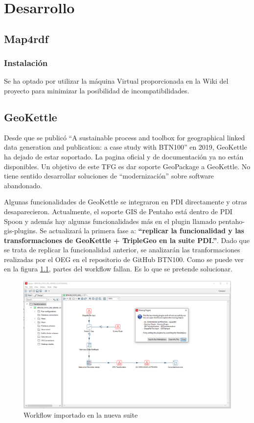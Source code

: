 \chapter{Desarrollo}

\section{Map4rdf}
\subsection{Instalación}

Se ha optado por utilizar la máquina Virtual proporcionada en la Wiki del proyecto para minimizar la posibilidad
de incompatibilidades.

\section{GeoKettle}

Desde que se publicó ``A sustainable process and toolbox for geographical linked data generation and
publication: a case study with BTN100'' en 2019, GeoKettle ha dejado de estar soportado. La pagina oficial y de
documentación ya no están disponibles.
Un objetivo de este TFG es dar soporte GeoPackage a GeoKettle. No tiene sentido desarrollar soluciones de
``modernización'' sobre software abandonado.

Algunas funcionalidades de GeoKettle se integraron en PDI directamente y otras desaparecieron. 
Actualmente, el soporte GIS de Pentaho está dentro de PDI Spoon y además hay algunas funcionalidades más en
 el plugin llamado pentaho-gis-plugins\cite{gis-plugins}. Se actualizará la primera fase a:
\textbf{``replicar la funcionalidad y las transformaciones de GeoKettle + TripleGeo en la suite PDI.''}. 
Dado que se trata de replicar la funcionalidad anterior, se analizarán las tranformaciones realizadas por el OEG
en el repositorio de GitHub BTN100. Como se puede ver en la figura \ref{fig:spoon-missing-plugins}, partes del
workflow fallan. Es lo que se pretende solucionar.

\begin{figure}[H]
    \includegraphics[width=\textwidth]{images/spoon-missing-plugins.png}
    \centering
    \caption{Workflow importado en la nueva suite}
    \label{fig:spoon-missing-plugins}
\end{figure}

